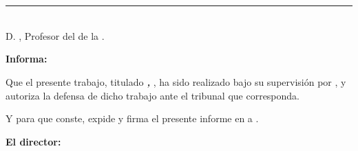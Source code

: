 






\chapter*{}
\thispagestyle{empty}

\noindent\rule[-1ex]{\textwidth}{2pt}\\[4.5ex]

D. \textbf{\myProf}, Profesor del \myDepartment de la \myUni.

\vspace{0.5cm}

\textbf{Informa:}

\vspace{0.5cm}

Que el presente trabajo, titulado \textit{\textbf{\myTitle, \mySubtitle}}, ha sido realizado bajo su supervisión por \textbf{\myName}, y autoriza la defensa de dicho trabajo ante el tribunal que corresponda.

\vspace{0.5cm}

Y para que conste, expide y firma el presente informe en \myLocation a \myTime.

\vspace{1cm}

\textbf{El director:}

\vspace{5cm}

\noindent \textbf{\myProf}


\dedication{A mi historiadora del arte}
